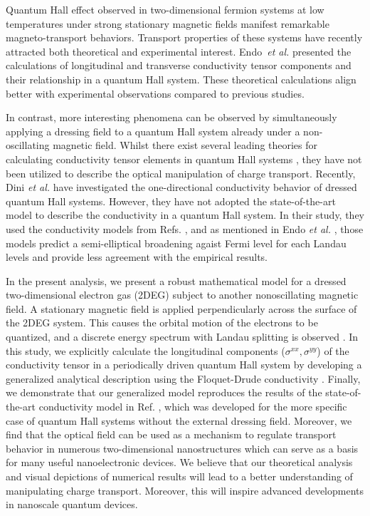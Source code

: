 Quantum Hall effect \cite{girvin90} observed in two-dimensional fermion systems at low temperatures under strong stationary magnetic fields manifest remarkable magneto-transport behaviors. Transport properties of these systems have recently attracted both theoretical \cite{ando72,ando74_1,ando74_2,ando74_3,ando74_4,ando82,endo09} and experimental \cite{allerman95,tieke97,pan05} interest.
Endo \textit{et al.} \cite{endo09} presented the calculations of longitudinal and transverse conductivity tensor components and their relationship in a quantum Hall system. These theoretical calculations  align better with experimental observations compared to previous studies.

In contrast, more interesting phenomena can be observed by simultaneously applying a dressing field to a quantum Hall system already under a non-oscillating magnetic field.
Whilst there exist several leading theories for calculating conductivity tensor elements in quantum Hall systems \cite{ando74_1,ando82,endo09}, they have not been utilized to describe the optical manipulation of charge transport.
Recently, Dini \textit{et al.} \cite{dini16} have investigated the one-directional conductivity behavior of dressed quantum Hall systems. However, they have not adopted the state-of-the-art model to describe the conductivity in a quantum Hall system. In their study, they used the conductivity models from Refs. \cite{ando74_1,ando82}, and as mentioned in Endo \textit{et al.} \cite{endo09}, those models predict a semi-elliptical broadening agaist Fermi level for each Landau levels and provide less agreement with the empirical results.

In the present analysis, we present a robust mathematical model for a dressed two-dimensional electron gas (2DEG) subject to another nonoscillating magnetic field.
A stationary magnetic field is applied perpendicularly across the surface of the 2DEG system. This causes the orbital motion of the electrons to be quantized, and a discrete energy spectrum with Landau splitting is observed \cite{landau30}.
In this study, we explicitly calculate the longitudinal components ($\sigma^{xx},\sigma^{yy}$) of the conductivity tensor in a periodically driven quantum Hall system by developing a generalized analytical description using the Floquet-Drude conductivity \cite{wackerl20}.
Finally, we demonstrate that our generalized model reproduces the results of the state-of-the-art conductivity model in Ref. \cite{endo09}, which was developed for the more specific case of quantum Hall systems without the external dressing field.
Moreover, we find that the optical field can be used as a mechanism to regulate transport behavior in numerous two-dimensional nanostructures which can serve as a basis for many useful nanoelectronic devices. We believe that our theoretical analysis and visual depictions of numerical results will lead to a better understanding of manipulating charge transport. Moreover, this will inspire advanced  developments in nanoscale quantum devices.

